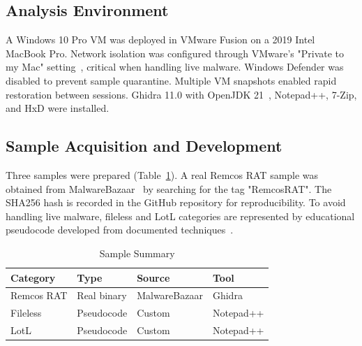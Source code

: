 \documentclass[sigconf]{acmart}
\begin{document}

\subsection{Analysis Environment}

\vspace{0.5em}
\qquad A Windows 10 Pro VM was deployed in VMware Fusion on a 2019 Intel MacBook Pro. Network isolation was configured through VMware's "Private to my Mac" setting~\cite{vmware2024fusion}, critical when handling live malware. Windows Defender was disabled to prevent sample quarantine. Multiple VM snapshots enabled rapid restoration between sessions. Ghidra 11.0 with OpenJDK 21~\cite{nsacyber2024ghidra}, Notepad++, 7-Zip, and HxD were installed.


\subsection{Sample Acquisition and Development}

\vspace{0.5em}
\qquad Three samples were prepared (Table~\ref{tab:samples}). A real Remcos RAT sample was obtained from MalwareBazaar~\cite{malwarebazaar2024} by searching for the tag "RemcosRAT". The SHA256 hash is recorded in the GitHub repository for reproducibility. To avoid handling live malware, fileless and LotL categories are represented by educational pseudocode developed from documented techniques~\cite{bytecode2024lotl, lolbas2024project}.

\begin{table}[h]
\caption{Sample Summary}
\label{tab:samples}
\small
\begin{tabular}{@{}llll@{}}
\toprule
\textbf{Category} & \textbf{Type} & \textbf{Source} & \textbf{Tool} \\
\midrule
Remcos RAT & Real binary & MalwareBazaar & Ghidra \\
Fileless & Pseudocode & Custom & Notepad++ \\
LotL & Pseudocode & Custom & Notepad++ \\
\bottomrule
\end{tabular}
\end{table}
\end{document}
